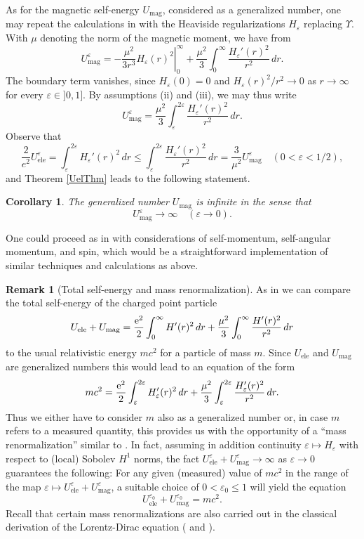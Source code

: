 \documentclass[sumlimits,intlimits,namelimits%
]{amsart}
\newtheorem{corollary}[theorem]{Corollary}
\theoremstyle{definition}
\newtheorem{remark}[theorem]{Remark}
\newcommand{\eps}{\varepsilon}
\newcommand{\e}{\textup{e}}
\newcommand{\Uel}{U_{\text{ele}}}
\newcommand{\Uma}{U_{\text{mag}}}
\begin{document}
As for the magnetic self-energy $\Uma$, considered as a generalized number, one may repeat the calculations in \cite[Section VII, Equations (7.1)-(7.14)]{GsponerJMP} with the Heaviside regularizations $H_\eps$ replacing $\Upsilon$. With $\mu$ denoting the norm of the magnetic moment, we have from \cite[Equation (7.14)]{GsponerJMP}
$$
   \Uma^\eps = - \left. \frac{\mu^2}{3 r^3} H_\eps(r)^2 \right|_0^\infty + \frac{\mu^2}{3} \int_0^\infty \frac{H_\eps'(r)^2}{r^2} \, dr.
$$
The boundary term vanishes, since $H_\eps(0) = 0$ and $H_\eps(r)^2/r^2 \to 0$ as $r \to \infty$ for every $\eps \in ]0,1]$. By assumptions (ii) and (iii), we may thus write
$$
  \Uma^\eps = \frac{\mu^2}{3} \int_\eps^{2 \eps} \frac{H_\eps'(r)^2}{r^2} \, dr.
$$
Observe that 
$$
    \frac{2}{e^2} \Uel^\eps =  \int_\eps^{2 \eps} H_\eps'(r)^2 \, dr \leq 
        \int_\eps^{2 \eps} \frac{H_\eps'(r)^2}{r^2} \, dr = \frac{3}{\mu^2} \Uma^\eps 
        \quad (0 < \eps < 1/2),
$$
and Theorem \ref{UelThm} leads to the following statement.

\begin{corollary} The generalized number $\Uma$ is infinite in the sense that
$$
   \Uma^\eps \to \infty \quad (\eps \to 0).
$$
\end{corollary}

One could proceed as in \cite{GsponerJMP} with considerations of self-momentum, self-angular momentum, and spin, which would be a straightforward implementation of similar techniques and calculations as above.

\begin{remark}[Total self-energy and mass renormalization] As in \cite[Section X]{GsponerJMP} we can compare the total self-energy of the charged point particle 
$$
   \Uel + \Uma =  \frac{\e^2}{2} \int_0^\infty H'(r)^2 \, dr + \frac{\mu^2}{3} \int_0^\infty \frac{H'(r)^2}{r^2} \, dr
$$
to the usual relativistic energy $m c^2$ for a particle of mass $m$. Since $\Uel$ and $\Uma$ are generalized numbers this would lead to an equation of the form
$$
    m c^2 =  \frac{\e^2}{2} \int_\eps^{2 \eps} H_\eps'(r)^2 \, dr + \frac{\mu^2}{3} \int_\eps^{2 \eps} \frac{H_\eps'(r)^2}{r^2} \, dr.
$$
Thus we either have to consider $m$ also as a generalized number or, in case $m$ refers to a measured quantity, this provides us with the opportunity of a ``mass renormalization'' similar to \cite[Section X]{GsponerJMP}. In fact, assuming in addition continuity $\eps \mapsto H_\eps$ with respect to (local) Sobolev $H^1$ norms, the fact $\Uel^\eps + \Uma^\eps \to \infty$ as $\eps \to 0$ guarantees the following: For any given (measured) value of $m c^2$ in the range of the map $\eps \mapsto \Uel^\eps + \Uma^\eps$, a suitable choice of $0 < \eps_0 \leq 1$ will yield the equation
$$
   \Uel^{\eps_0} + \Uma^{\eps_0} = m c^2.
$$
Recall that certain mass renormalizations are also carried out in the classical derivation of the Lorentz-Dirac equation (\cite[Section 8.4]{Thirring:01} and \cite[Section 4.3]{Parrott}).
\end{remark}
\end{document}
